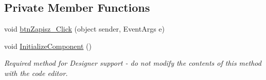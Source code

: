 \subsection*{Private Member Functions}
\begin{DoxyCompactItemize}
\item 
void \hyperlink{class_dziennik_ocen_1_1_form_zarzadzaj_projektem_a903734712c2bc1345ff56fe786a96e22}{btn\+Zapisz\+\_\+\+Click} (object sender, Event\+Args e)
\item 
void \hyperlink{class_dziennik_ocen_1_1_form_zarzadzaj_projektem_a9531760113ecca03261970889c094c96}{Initialize\+Component} ()
\begin{DoxyCompactList}\small\item\em Required method for Designer support -\/ do not modify the contents of this method with the code editor. \end{DoxyCompactList}\end{DoxyCompactItemize}
